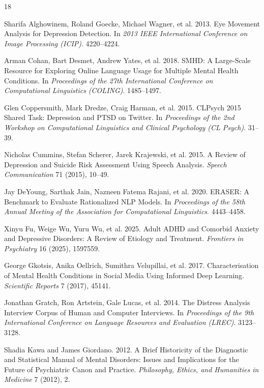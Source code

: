 \documentclass[sigconf]{acmart}
\begin{document}
\begin{thebibliography}{18}

Sharifa Alghowinem, Roland Goecke, Michael Wagner, et al. 2013. Eye Movement Analysis for Depression Detection. In \textit{2013 IEEE International Conference on Image Processing (ICIP)}. 4220--4224.

Arman Cohan, Bart Desmet, Andrew Yates, et al. 2018. SMHD: A Large-Scale Resource for Exploring Online Language Usage for Multiple Mental Health Conditions. In \textit{Proceedings of the 27th International Conference on Computational Linguistics (COLING)}. 1485--1497.

Glen Coppersmith, Mark Dredze, Craig Harman, et al. 2015. CLPsych 2015 Shared Task: Depression and PTSD on Twitter. In \textit{Proceedings of the 2nd Workshop on Computational Linguistics and Clinical Psychology (CL Psych)}. 31--39.

Nicholas Cummins, Stefan Scherer, Jarek Krajewski, et al. 2015. A Review of Depression and Suicide Risk Assessment Using Speech Analysis. \textit{Speech Communication} 71 (2015), 10--49.

Jay DeYoung, Sarthak Jain, Nazneen Fatema Rajani, et al. 2020. ERASER: A Benchmark to Evaluate Rationalized NLP Models. In \textit{Proceedings of the 58th Annual Meeting of the Association for Computational Linguistics}. 4443--4458.

Xinyu Fu, Weige Wu, Yuru Wu, et al. 2025. Adult ADHD and Comorbid Anxiety and Depressive Disorders: A Review of Etiology and Treatment. \textit{Frontiers in Psychiatry} 16 (2025), 1597559.

George Gkotsis, Anika Oellrich, Sumithra Velupillai, et al. 2017. Characterisation of Mental Health Conditions in Social Media Using Informed Deep Learning. \textit{Scientific Reports} 7 (2017), 45141.

Jonathan Gratch, Ron Artstein, Gale Lucas, et al. 2014. The Distress Analysis Interview Corpus of Human and Computer Interviews. In \textit{Proceedings of the 9th International Conference on Language Resources and Evaluation (LREC)}. 3123--3128.

Shadia Kawa and James Giordano. 2012. A Brief Historicity of the Diagnostic and Statistical Manual of Mental Disorders: Issues and Implications for the Future of Psychiatric Canon and Practice. \textit{Philosophy, Ethics, and Humanities in Medicine} 7 (2012), 2.


\end{thebibliography}
\end{document}
